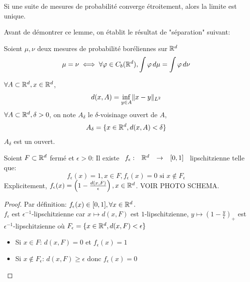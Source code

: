 \documentclass[]{report}
\begin{document}
    \begin{lm}{}{}
        Si une suite de mesures de probabilité converge étroitement, alors la limite est unique.
    \end{lm}

    Avant de démontrer ce lemme, on établit le résultat de "séparation" suivant:

    \begin{lm}{}{}
        Soient $\mu,\nu$ deux mesures de probabilité boréliennes sur $\mathbb{R}^d$
        \[\mu=\nu \iff \forall \varphi\in C_b(\mathbb{R}^d),\int \varphi \,d\mu=\int \varphi\, d\nu\]
    \end{lm}

    \begin{nt}{}{}
        $\forall A\subset \mathbb{R}^d,x\in \mathbb{R}^d$,
        \[d(x,A)=\inf_{y\in A}\lVert x-y \rVert_{L^2}\]
        $\forall A\subset \mathbb{R}^d,\delta>0$, on note $A_\delta$ le $\delta$-voisinage ouvert de $A$,
        \[A_\delta=\{x\in \mathbb{R}^d,d(x,A)<\delta\}\]
        $A_\delta$ est un ouvert.
    \end{nt}

    \begin{lm}{}{}
        Soient $F\subset \mathbb{R}^d$ fermé et $\epsilon>0$: Il existe $\begin{array}{ccccc} f_{\epsilon} : & \mathbb{R}^d & \to & [0,1] \end{array}$ lipschitzienne telle que:
        \[ f_{\epsilon}(x)=1,x\in F,f_{\epsilon}(x)=0\text{ si }x\not\in F_\epsilon\]
        Explicitement, $f_\epsilon (x)=\left( 1-\frac{d(x,F)}{\epsilon}\right),x\in \mathbb{R}^d$. VOIR PHOTO SCHEMA.
    \end{lm}

    \begin{proof}
        Par définition: $f_\epsilon (x)\in [0,1],\forall x\in \mathbb{R}^d$.\\
        $f_\epsilon$ est $\epsilon^{-1}$-lipschitzienne car $x\mapsto d(x,F)$ est $1$-lipschitzienne, $y\mapsto (1-\frac{y}{\epsilon})_+$ est $\epsilon^{-1}$-lipschitzienne où $F_\epsilon=\{x\in \mathbb{R}^d,d(x,F)<\epsilon\}$\\
        \begin{itemize}
            \item Si $x\in F$: $d(x,F)=0$ et $f_\epsilon(x)=1$
            \item Si $x\notin F_\epsilon$: $d(x,F)\ge \epsilon$ donc $f_\epsilon (x)=0$
        \end{itemize}
    \end{proof}
\end{document}
